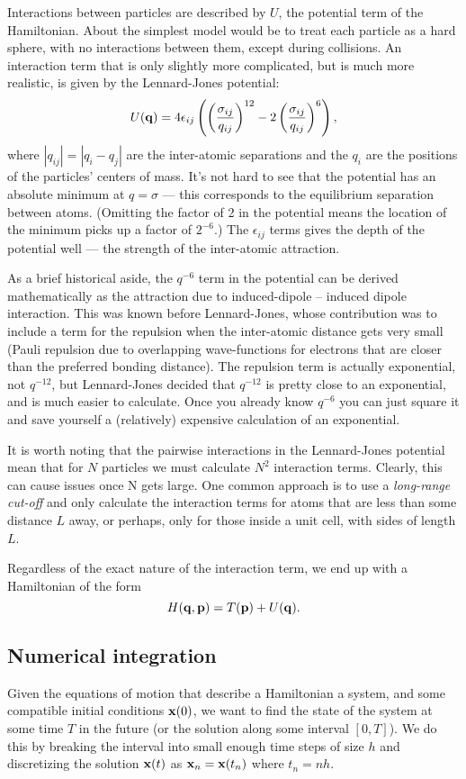 Interactions between particles are described by $U$, the potential term of the Hamiltonian. About the simplest model would be to treat each particle as a hard sphere, with no interactions between them, except during collisions.
An interaction term that is only slightly more complicated, but is much more realistic, is given by the Lennard-Jones potential:
$$
	U({\bf q}) = 4\epsilon_{ij}\left(\left(\frac{\sigma_{ij}}{q_{ij}}\right)^{12} - 2\left(\frac{\sigma_{ij}}{q_{ij}}\right)^{6}\right),
$$
where $|q_{ij}| = |q_i-q_j|$ are the inter-atomic separations and the $q_i$ are the positions of the particles' centers of mass. It's not hard to see that the potential has an absolute minimum at $q = \sigma$ --- this corresponds to the equilibrium separation between atoms. (Omitting the factor of 2 in the potential means the location of the minimum picks up a factor of $2^{-6}$.) The $\epsilon_{ij}$ terms gives the depth of the potential well --- the strength of the inter-atomic attraction. 

As a brief historical aside, the $q^{-6}$ term in the potential can be derived mathematically as the attraction due to induced-dipole -- induced dipole interaction. This was known before Lennard-Jones, whose contribution was to include a term for the repulsion when the inter-atomic distance gets very small (Pauli repulsion due to overlapping wave-functions for electrons that are closer than the preferred bonding distance). The repulsion term is actually exponential, not $q^{-12}$, but Lennard-Jones decided that $q^{-12}$ is pretty close to an exponential, and is much easier to calculate. Once you already know $q^{-6}$ you can just square it and save yourself a (relatively) expensive calculation of an exponential.

It is worth noting that the pairwise interactions in the Lennard-Jones potential mean that for $N$ particles we must calculate $N^2$ interaction terms. Clearly, this can cause issues once N gets large. One common approach is to use a \emph{long-range cut-off} and only calculate the interaction terms for atoms that are less than some distance $L$ away, or perhaps, only for those inside a unit cell, with sides of length $L$.

Regardless of the exact nature of the interaction term, we end up with a Hamiltonian of the form 
$$
	H({\bf q},{\bf p}) = T({\bf p}) + U({\bf q}).
$$

\subsection{Numerical integration}
Given the equations of motion that describe a Hamiltonian a system, and some compatible initial conditions ${\bf x}(0)$, we want to find the state of the system at some time $T$ in the future (or the solution along some interval $[0,T]$). We do this by breaking the interval into small enough time steps of size $h$ and discretizing the solution ${\bf x}(t)$ as ${\bf x}_n = {\bf x}(t_n) $ where $t_n = nh$.

